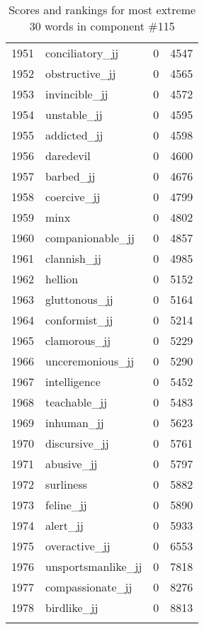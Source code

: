 \begin{longtable}[!htbp]{| rlr@{.}l |}
    1951 & conciliatory\_jj & 0 & 4547 \\
    1952 & obstructive\_jj & 0 & 4565 \\
    1953 & invincible\_jj & 0 & 4572 \\
    1954 & unstable\_jj & 0 & 4595 \\
    1955 & addicted\_jj & 0 & 4598 \\
    1956 & daredevil & 0 & 4600 \\
    1957 & barbed\_jj & 0 & 4676 \\
    1958 & coercive\_jj & 0 & 4799 \\
    1959 & minx & 0 & 4802 \\
    1960 & companionable\_jj & 0 & 4857 \\
    1961 & clannish\_jj & 0 & 4985 \\
    1962 & hellion & 0 & 5152 \\
    1963 & gluttonous\_jj & 0 & 5164 \\
    1964 & conformist\_jj & 0 & 5214 \\
    1965 & clamorous\_jj & 0 & 5229 \\
    1966 & unceremonious\_jj & 0 & 5290 \\
    1967 & intelligence & 0 & 5452 \\
    1968 & teachable\_jj & 0 & 5483 \\
    1969 & inhuman\_jj & 0 & 5623 \\
    1970 & discursive\_jj & 0 & 5761 \\
    1971 & abusive\_jj & 0 & 5797 \\
    1972 & surliness & 0 & 5882 \\
    1973 & feline\_jj & 0 & 5890 \\
    1974 & alert\_jj & 0 & 5933 \\
    1975 & overactive\_jj & 0 & 6553 \\
    1976 & unsportsmanlike\_jj & 0 & 7818 \\
    1977 & compassionate\_jj & 0 & 8276 \\
    1978 & birdlike\_jj & 0 & 8813 \\
    \hline
    \caption{Scores and rankings for most extreme 30 words in component \#115} \\
\end{longtable}
